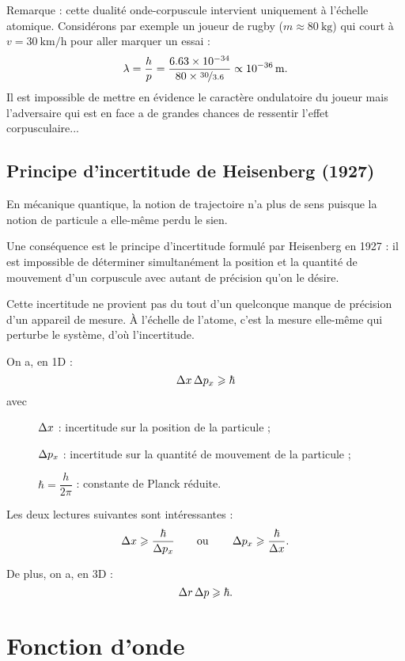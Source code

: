 Remarque : cette dualité onde-corpuscule intervient uniquement à l'échelle atomique. Considérons par exemple un joueur de rugby (\(m\approx\SI{80}{\kilo\gram}\)) qui court à \(v=\SI{30}{\kilo\meter\per\hour}\) pour aller marquer un essai : \[\lambda=\dfrac{h}{p}=\dfrac{\num{6.63e-34}}{\num{80}\times\nicefrac{\num{30}}{\num{3.6}}}\propto\SI{e-36}{\meter}.\] Il est impossible de mettre en évidence le caractère ondulatoire du joueur mais l'adversaire qui est en face a de grandes chances de ressentir l'effet corpusculaire...

\subsection{Principe d'incertitude de Heisenberg (1927)}

En mécanique quantique, la notion de trajectoire n'a plus de sens puisque la notion de particule a elle-même perdu le sien.

Une conséquence est le principe d'incertitude formulé par Heisenberg en 1927 : il est impossible de déterminer simultanément la position et la quantité de mouvement d'un corpuscule avec autant de précision qu'on le désire.

Cette incertitude ne provient pas du tout d'un quelconque manque de précision d'un appareil de mesure. À l'échelle de l'atome, c'est la mesure elle-même qui perturbe le système, d'où l'incertitude.

On a, en 1D : \[\adif{x}\adif{p_x}\geq\hbar\] avec \begin{description}
    \item[] \(\adif{x}\) : incertitude sur la position de la particule ;
    \item[] \(\adif{p_x}\) : incertitude sur la quantité de mouvement de la particule ;
    \item[] \(\hbar=\dfrac{h}{2\pi}\) : constante de Planck réduite. \\
\end{description}

Les deux lectures suivantes sont intéressantes : \[\adif{x}\geq\dfrac{\hbar}{\adif{p_x}}\qquad\text{ou}\qquad\adif{p_x}\geq\dfrac{\hbar}{\adif{x}}.\]

De plus, on a, en 3D : \[\adif{r}\adif{p}\geq\hbar.\]

\section{Fonction d'onde}

